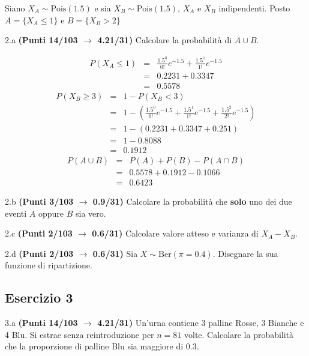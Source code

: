 \documentclass[
  11pt,
]{book}
\theoremstyle{mytheoremstyle}
\theoremstyle{mydefstyle}
\newenvironment{sol}
  {
  \begin{tcolorbox}[enhanced,breakable,arc=0.1mm,boxrule=1pt,colback=white,colframe=iblue,
  title=\bf \fontfamily{lmss}\selectfont \hspace{.5 cm} Soluzione,drop fuzzy shadow]

}{
\end{tcolorbox}
  }
\begin{document}
Siano \(X_A\sim \text{Pois}(1.5)\) e sia \(X_B\sim \text{Pois}(1.5)\), \(X_A\) e \(X_B\) indipendenti. Posto \(A=\{X_A\le 1\}\) e \(B=\{X_B>2\}\)

2.a \textbf{(Punti 14/103 \(\rightarrow\) 4.21/31)} Calcolare la probabilità di \(A\cup B\).

\begin{sol}
\begin{eqnarray*}
   P( X_A \leq 1 ) &=& \frac{ 1.5 ^{ 0 }}{ 0 !}e^{- 1.5 }+\frac{ 1.5 ^{ 1 }}{ 1 !}e^{- 1.5 } \\                 &=& 0.2231+0.3347 \\                 &=& 0.5578 
\end{eqnarray*}
\begin{eqnarray*}
   P( X_B \geq 3 ) &=& 1-P( X_B < 3 ) \\                 &=& 1-\left( \frac{ 1.5 ^{ 0 }}{ 0 !}e^{- 1.5 }+\frac{ 1.5 ^{ 1 }}{ 1 !}e^{- 1.5 }+\frac{ 1.5 ^{ 2 }}{ 2 !}e^{- 1.5 } \right)\\                 &=& 1-( 0.2231+0.3347+0.251 )\\                 &=& 1- 0.8088 \\                 &=&   0.1912 
\end{eqnarray*}
\begin{eqnarray*}
  P(A\cup B) &=&  P(A)+P(B)-P(A\cap B)\\
  &=& 0.5578+0.1912-0.1066\\
  &=& 0.6423
\end{eqnarray*}

\end{sol}

2.b \textbf{(Punti 3/103 \(\rightarrow\) 0.9/31)} Calcolare la probabilità che \textbf{solo} uno dei due eventi \(A\) oppure \(B\) sia vero.

2.c \textbf{(Punti 2/103 \(\rightarrow\) 0.6/31)} Calcolare valore atteso e varianza di \(X_A-X_B\).

2.d \textbf{(Punti 2/103 \(\rightarrow\) 0.6/31)} Sia \(X\sim\text{Ber}(\pi=0.4)\). Disegnare la sua funzione di ripartizione.

\subsection{Esercizio 3}\label{esercizio-3-25}

3.a \textbf{(Punti 14/103 \(\rightarrow\) 4.21/31)} Un'urna contiene 3 palline Rosse, 3 Bianche e 4 Blu. Si estrae senza reintroduzione per \(n=81\) volte.
Calcolare la probabilità che la proporzione di palline Blu sia maggiore di 0.3.
\end{document}

